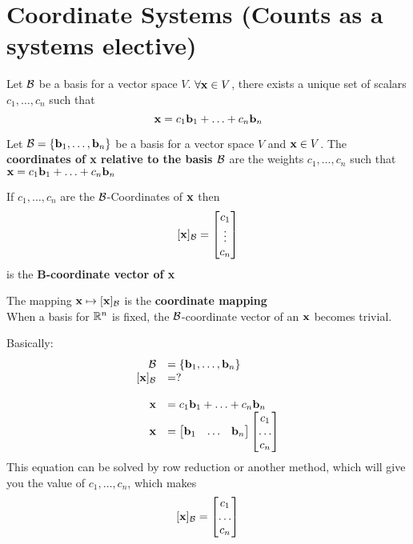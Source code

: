 \documentclass{report}
\begin{document}
\section{Coordinate Systems (Counts as a systems elective)}
\begin{theorem}
    Let $\mathcal{B}$ be a basis for a vector space $V$. $\forall \mathbf{x} \in V$, there exists
    a unique set of scalars $c_1, \ldots, c_n$ such that \[
    \mathbf{x} = c_1\mathbf{b}_1 + \ldots + c_n\mathbf{b}_n
    \]
\end{theorem}

\begin{definition}
    Let $\mathcal{B} = \{\mathbf{b}_1, \ldots, \mathbf{b}_n\}$ be a basis for a vector space $V$ and $\mathbf{x} \in V$. 
    The \textbf{coordinates of x relative to the basis $\mathcal{B}$} are the weights $c_1, \ldots, c_n$ such that
    $\mathbf{x} = c_1\mathbf{b}_1 + \ldots + c_n\mathbf{b}_n $
\end{definition}

If $c_1, \ldots, c_n$ are the $\mathcal{B}$-Coordinates of $\mathbf{x}$ then \[
[\mathbf{x}]_{\mathcal{B}} = \begin{bmatrix}
    c_1 \\ \vdots \\ c_n
\end{bmatrix}
\]
is the \textbf{B-coordinate vector of x}

The mapping $\mathbf{x} \mapsto [\mathbf{x}]_{\mathcal{B}}$ is the \textbf{coordinate mapping}
\\

When a basis for $\mathbb{R}^n$ is fixed, the $\mathcal{B}$-coordinate vector of an $\mathbf{x}$ becomes trivial.

Basically:
\[
\begin{array}{rlr}
    \BB &= \{\bb_1, \ldots, \bb_n\} \\
    \cB &= ?
    \\\\
    \xx &= c_1 \bb_1 + \ldots + c_n \bb_n \\ 
    \xx &= \begin{bmatrix}
        \bb_1 & \ldots & \bb_n
    \end{bmatrix} 
    \begin{bmatrix}
        c_1 \\ \ldots \\ c_n
    \end{bmatrix}
\end{array}
\]
This equation can be solved by row reduction or another method, 
which will give you the value of $c_1, \ldots, c_n$, which makes \[
    [\mathbf{x}]_{\mathcal{B}} = \begin{bmatrix}
        c_1 \\ \ldots \\ c_n
    \end{bmatrix}
\]
\end{document}
